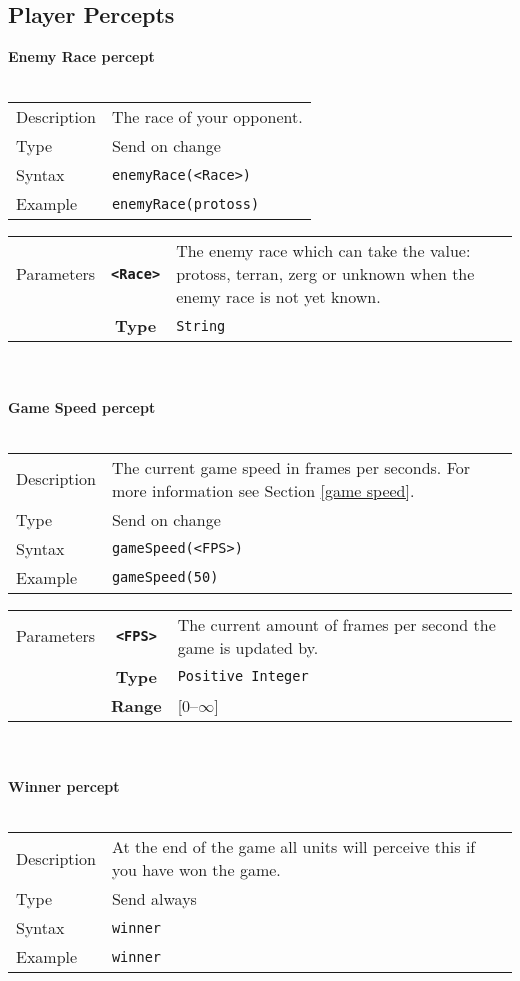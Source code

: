 \subsection{Player Percepts}
\textbf{Enemy Race percept}\\
\\
\begin{tabularx}{\textwidth}{lX}
 Description & The race of your opponent. \\
 Type & Send on change \\
 Syntax &  \verb|enemyRace(<Race>)| \\
 Example & \verb|enemyRace(protoss)|   \\
 \end{tabularx}
 \begin{tabularx}{\textwidth}{l | c | p{8cm}|}
 \cline{2-3}
  Parameters & \textbf{\verb|<Race>|} & The enemy race which can take the value: protoss, terran, zerg or unknown                 when the enemy race is not yet known. \\
             & \textbf{Type} & \verb|String| \\
            \cline{2-3}
\end{tabularx}
\\\\
\noindent
\textbf{Game Speed percept}\\
\\
\begin{tabularx}{\textwidth}{lX}
 Description & The current game speed in frames per seconds. For more information see Section \ref{game speed}. \\
 Type & Send on change \\
 Syntax &  \verb|gameSpeed(<FPS>)| \\
 Example & \verb|gameSpeed(50)|   \\
 \end{tabularx}
 \begin{tabularx}{\textwidth}{l | c | p{8cm}|}
 \cline{2-3}
  Parameters & \textbf{\verb|<FPS>|} & The current amount of frames per second the game is updated by. \\
             & \textbf{Type} & \verb|Positive Integer| \\
             & \textbf{Range} & [0--$\infty$] \\
            \cline{2-3}
\end{tabularx}
\\\\
\noindent
\textbf{Winner percept}\\
\\
\begin{tabularx}{\textwidth}{lX}
 Description & At the end of the game all units will perceive this if you have won the game. \\
 Type & Send always \\
 Syntax &  \verb|winner| \\
 Example & \verb|winner|   \\
 \end{tabularx}

